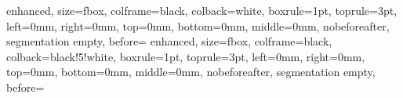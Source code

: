 \setheadfoot{14pt}{28pt}

\ifdraftdoc
\else
\fi

\ifdraftdoc
\else
\fi

\newcommand{\boxedsec}[1]
 {%
  \begin{tcolorbox}%
   [%
    enhanced,%
    nobeforeafter,%
    before={\noindent},%
    colframe=black,%
    colback=black!15!white,%
    boxrule=2pt,%
    leftrule=2mm,%
    left=0mm,%
    right=0mm,%
    top=0mm,%
    bottom=0mm%
   ]
   \hfill\LARGE\bfseries#1
  \end{tcolorbox}
 }
\setsecheadstyle{\boxedsec}
\newcommand{\sectionbreak}{\phantomsection}

%
 {%
  enhanced,%
  size=fbox,%
  colframe=black,%
  colback=white,%
  boxrule=1pt,%
  toprule=3pt,%
  left=0mm,%
  right=0mm,%
  top=0mm,%
  bottom=0mm,%
  middle=0mm,%
  nobeforeafter,%
  segmentation empty,%
  before={\noindent}%
 }
%
 {%
  enhanced,%
  size=fbox,%
  colframe=black,%
  colback=black!5!white,%
  boxrule=1pt,%
  toprule=3pt,%
  left=0mm,%
  right=0mm,%
  top=0mm,%
  bottom=0mm,%
  middle=0mm,%
  nobeforeafter,%
  segmentation empty,%
  before={\noindent}%
 }




